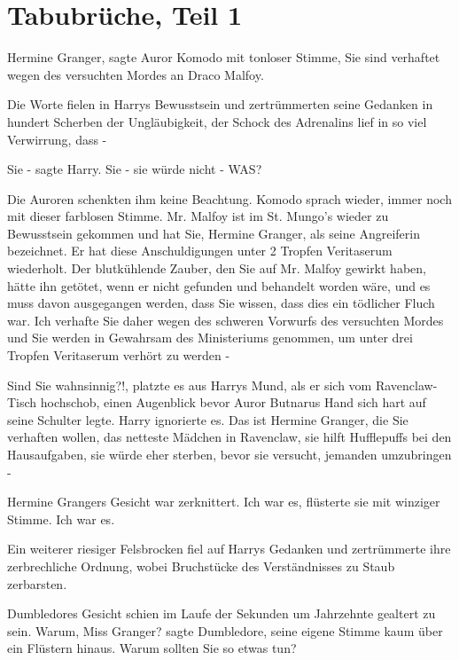 \chapter{Tabubrüche, Teil 1}

\glqq{}Hermine Granger\grqq{}, sagte Auror Komodo mit tonloser Stimme, \glqq{}Sie
sind verhaftet wegen des versuchten Mordes an Draco Malfoy.\grqq{}

Die Worte fielen in Harrys Bewusstsein und zertrümmerten seine Gedanken in
hundert Scherben der Ungläubigkeit, der Schock des Adrenalins lief in so viel
Verwirrung, dass -

\glqq{}Sie -\grqq{} sagte Harry. \glqq{}Sie - sie würde nicht - WAS?\grqq{}

Die Auroren schenkten ihm keine Beachtung. Komodo sprach wieder, immer noch mit
dieser farblosen Stimme. \glqq{}Mr. Malfoy ist im St. Mungo's wieder zu
Bewusstsein gekommen und hat Sie, Hermine Granger, als seine Angreiferin
bezeichnet. Er hat diese Anschuldigungen unter 2 Tropfen Veritaserum wiederholt.
Der blutkühlende Zauber, den Sie auf Mr. Malfoy gewirkt haben, hätte ihn
getötet, wenn er nicht gefunden und behandelt worden wäre, und es muss davon
ausgegangen werden, dass Sie wissen, dass dies ein tödlicher Fluch war. Ich
verhafte Sie daher wegen des schweren Vorwurfs des versuchten Mordes und Sie
werden in Gewahrsam des Ministeriums genommen, um unter drei Tropfen Veritaserum
verhört zu werden -\grqq{}

\glqq{}Sind Sie wahnsinnig?!\grqq{}, platzte es aus Harrys Mund, als er sich vom
Ravenclaw-Tisch hochschob, einen Augenblick bevor Auror Butnarus Hand sich hart
auf seine Schulter legte. Harry ignorierte es. \glqq{}Das ist Hermine Granger,
die Sie verhaften wollen, das netteste Mädchen in Ravenclaw, sie hilft
Hufflepuffs bei den Hausaufgaben, sie würde eher sterben, bevor sie versucht,
jemanden umzubringen -\grqq{}

Hermine Grangers Gesicht war zerknittert. \glqq{}Ich war es\grqq{}, flüsterte sie
mit winziger Stimme. \glqq{}Ich war es.\grqq{}

Ein weiterer riesiger Felsbrocken fiel auf Harrys Gedanken und zertrümmerte ihre
zerbrechliche Ordnung, wobei Bruchstücke des Verständnisses zu Staub zerbarsten.

Dumbledores Gesicht schien im Laufe der Sekunden um Jahrzehnte gealtert zu sein.
\glqq{}Warum, Miss Granger?\grqq{} sagte Dumbledore, seine eigene Stimme kaum
über ein Flüstern hinaus. \glqq{}Warum sollten Sie so etwas tun?\grqq{}

